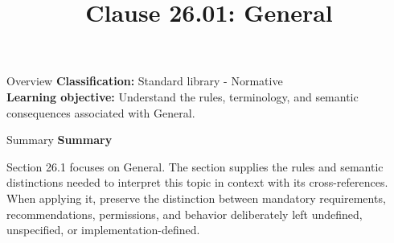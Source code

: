 \documentclass[10pt,letterpaper]{article}
\title{Clause 26.01: General}
\author{}
\date{}
\begin{document}
\maketitle
\begin{CornellOverviewBox}{Overview}
\textbf{Classification:} Standard library - Normative\\[2pt]
\textbf{Learning objective:} Understand the rules, terminology, and semantic consequences associated with General.
\end{CornellOverviewBox}\begin{CornellSummaryBox}{Summary}
{\sffamily\bfseries\color{Accent} Summary}\par\vspace{3pt}Section 26.1 focuses on General. The section supplies the rules and semantic distinctions needed to interpret this topic in context with its cross-references. When applying it, preserve the distinction between mandatory requirements, recommendations, permissions, and behavior deliberately left undefined, unspecified, or implementation-defined.
\end{CornellSummaryBox}
\end{document}
